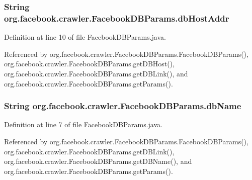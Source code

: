 \hypertarget{classorg_1_1facebook_1_1crawler_1_1_facebook_d_b_params_a793ad021972ce5b5b6bb88be88f01c67}{
\subsubsection[{db\-Host\-Addr}]{\setlength{\rightskip}{0pt plus 5cm}String org.\-facebook.\-crawler.\-Facebook\-D\-B\-Params.\-db\-Host\-Addr\hspace{0.3cm}{\ttfamily [private]}}}\label{classorg_1_1facebook_1_1crawler_1_1_facebook_d_b_params_a793ad021972ce5b5b6bb88be88f01c67}


Definition at line 10 of file Facebook\-D\-B\-Params.\-java.



Referenced by org.\-facebook.\-crawler.\-Facebook\-D\-B\-Params.\-Facebook\-D\-B\-Params(), org.\-facebook.\-crawler.\-Facebook\-D\-B\-Params.\-get\-D\-B\-Host(), org.\-facebook.\-crawler.\-Facebook\-D\-B\-Params.\-get\-D\-B\-Link(), and org.\-facebook.\-crawler.\-Facebook\-D\-B\-Params.\-get\-Params().

\hypertarget{classorg_1_1facebook_1_1crawler_1_1_facebook_d_b_params_a7f77783a820785d9c6b19bd5c3072d94}{
\subsubsection[{db\-Name}]{\setlength{\rightskip}{0pt plus 5cm}String org.\-facebook.\-crawler.\-Facebook\-D\-B\-Params.\-db\-Name\hspace{0.3cm}{\ttfamily [private]}}}\label{classorg_1_1facebook_1_1crawler_1_1_facebook_d_b_params_a7f77783a820785d9c6b19bd5c3072d94}


Definition at line 7 of file Facebook\-D\-B\-Params.\-java.



Referenced by org.\-facebook.\-crawler.\-Facebook\-D\-B\-Params.\-Facebook\-D\-B\-Params(), org.\-facebook.\-crawler.\-Facebook\-D\-B\-Params.\-get\-D\-B\-Link(), org.\-facebook.\-crawler.\-Facebook\-D\-B\-Params.\-get\-D\-B\-Name(), and org.\-facebook.\-crawler.\-Facebook\-D\-B\-Params.\-get\-Params().

